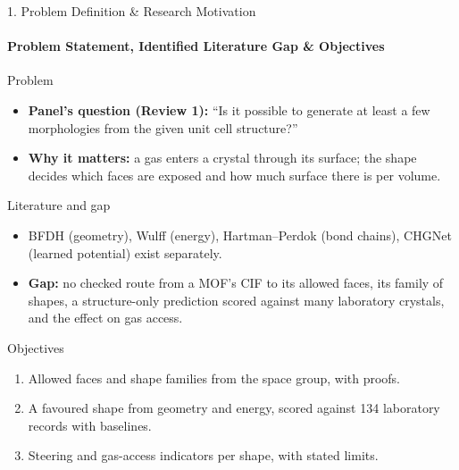 \documentclass[aspectratio=169, 11pt]{beamer}
\begin{document}
\begin{frame}[shrink=8]{1. Problem Definition \& Research Motivation}
    \framesubtitle{Problem Statement, Identified Literature Gap \& Objectives}
    \begin{block}{Problem}
        \footnotesize
        \begin{itemize}
            \item \textbf{Panel's question (Review 1):} ``Is it possible to generate at least a few morphologies from the given unit cell structure?''
            \item \textbf{Why it matters:} a gas enters a crystal through its surface; the shape decides which faces are exposed and how much surface there is per volume.
        \end{itemize}
    \end{block}
    \begin{block}{Literature and gap}
        \footnotesize
        \begin{itemize}
            \item BFDH (geometry), Wulff (energy), Hartman--Perdok (bond chains), CHGNet (learned potential) exist separately.
            \item \textbf{Gap:} no checked route from a MOF's CIF to its allowed faces, its family of shapes, a structure-only prediction scored against many laboratory crystals, and the effect on gas access.
        \end{itemize}
    \end{block}
    \begin{block}{Objectives}
        \footnotesize
        \begin{enumerate}
            \item Allowed faces and shape families from the space group, with proofs.
            \item A favoured shape from geometry and energy, scored against 134 laboratory records with baselines.
            \item Steering and gas-access indicators per shape, with stated limits.
        \end{enumerate}
    \end{block}
\end{frame}
\end{document}

